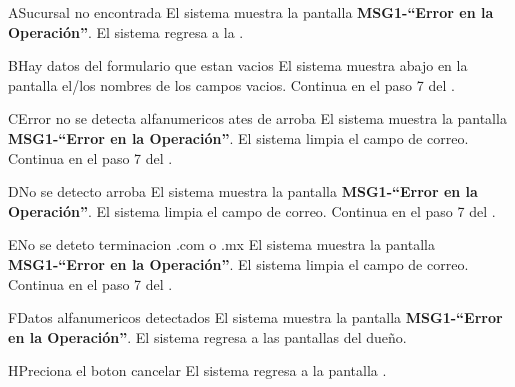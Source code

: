 
\begin{UCtrayectoriaA}{A}{Sucursal no encontrada}
			\UCpaso El sistema muestra la pantalla {\bf MSG1-``Error en la Operación''}.
			\UCpaso El sistema regresa a la .
		\end{UCtrayectoriaA}

\begin{UCtrayectoriaA}{B}{Hay datos del formulario que estan vacios}
	\UCpaso El sistema muestra abajo en la pantalla el/los nombres de los campos vacios.
	\UCpaso Continua en el paso 7 del .
\end{UCtrayectoriaA}	

\begin{UCtrayectoriaA}{C}{Error no se detecta alfanumericos ates de arroba}
	\UCpaso  El sistema muestra la pantalla {\bf MSG1-``Error en la Operación''}.
	\UCpaso El sistema limpia el campo de correo.
			\UCpaso Continua en el paso 7 del .
		\end{UCtrayectoriaA}

\begin{UCtrayectoriaA}{D}{No se detecto arroba}
	\UCpaso  El sistema muestra la pantalla {\bf MSG1-``Error en la Operación''}.
	\UCpaso El sistema limpia el campo de correo.
		\UCpaso Continua en el paso 7 del .
\end{UCtrayectoriaA}


\begin{UCtrayectoriaA}{E}{No se deteto terminacion .com o .mx}
	\UCpaso  El sistema muestra la pantalla {\bf MSG1-``Error en la Operación''}.
	\UCpaso El sistema limpia el campo de correo.
	 \UCpaso Continua en el paso 7 del .
\end{UCtrayectoriaA}


\begin{UCtrayectoriaA}{F}{Datos alfanumericos detectados}
			\UCpaso  El sistema muestra la pantalla {\bf MSG1-``Error en la Operación''}.
    	\UCpaso El sistema regresa a las pantallas del dueño.
\end{UCtrayectoriaA}

\begin{UCtrayectoriaA}{H}{Preciona el boton cancelar}
	\UCpaso El sistema regresa a la pantalla  .
\end{UCtrayectoriaA}